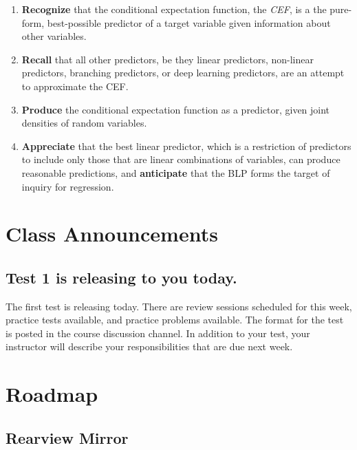 \documentclass[
]{book}
\providecommand{\tightlist}{%
  \setlength{\itemsep}{0pt}\setlength{\parskip}{0pt}}
\theoremstyle{definition}
\theoremstyle{definition}
\theoremstyle{definition}
\theoremstyle{definition}
\theoremstyle{remark}
\begin{document}
\begin{enumerate}
\def\labelenumi{\arabic{enumi}.}
\tightlist
\item
  \textbf{Recognize} that the conditional expectation function, the \emph{CEF}, is a the pure-form, best-possible predictor of a target variable given information about other variables.
\item
  \textbf{Recall} that all other predictors, be they linear predictors, non-linear predictors, branching predictors, or deep learning predictors, are an attempt to approximate the CEF.
\item
  \textbf{Produce} the conditional expectation function as a predictor, given joint densities of random variables.
\item
  \textbf{Appreciate} that the best linear predictor, which is a restriction of predictors to include only those that are linear combinations of variables, can produce reasonable predictions, and \textbf{anticipate} that the BLP forms the target of inquiry for regression.
\end{enumerate}

\hypertarget{class-announcements-2}{%
\section{Class Announcements}\label{class-announcements-2}}

\hypertarget{test-1-is-releasing-to-you-today.}{%
\subsection{Test 1 is releasing to you today.}\label{test-1-is-releasing-to-you-today.}}

The first test is releasing today. There are review sessions scheduled for this week, practice tests available, and practice problems available. The format for the test is posted in the course discussion channel. In addition to your test, your instructor will describe your responsibilities that are due next week.

\hypertarget{roadmap}{%
\section{Roadmap}\label{roadmap}}

\hypertarget{rearview-mirror}{%
\subsection{Rearview Mirror}\label{rearview-mirror}}
\end{document}
